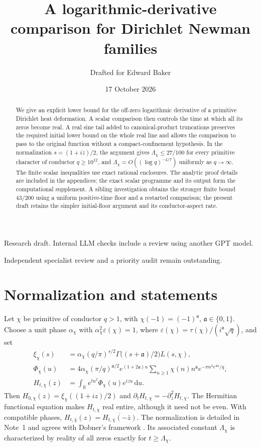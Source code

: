 \documentclass[11pt]{article}
\title{A logarithmic-derivative comparison for Dirichlet Newman families}
\author{Drafted for Edward Baker}
\date{17 October 2026}
\theoremstyle{remark}\newtheorem{remark}[theorem]{Remark}
\newcommand{\dd}{\mathrm{d}}
\begin{document}
\maketitle
\begin{center}\small Research draft. Internal LLM checks include a review using another GPT model.\par
Independent specialist review and a priority audit remain outstanding.\end{center}
\begin{abstract}
We give an explicit lower bound for the off-zero logarithmic derivative of
a primitive Dirichlet heat deformation. A scalar comparison then controls
the time at which all its zeros become real. A real sine tail added to
canonical-product truncations preserves the required initial lower bound
on the whole real line and allows the comparison to pass to the original
function without a compact-confinement hypothesis. In the normalization
$s=(1+iz)/2$, the argument gives $\Lambda_\chi\le27/100$ for every primitive
character of conductor $q\ge10^{12}$, and
$\Lambda_\chi=O((\log q)^{-4/7})$ uniformly as $q\to\infty$.
The finite scalar inequalities use exact rational enclosures. The analytic
proof details are included in the appendices; the exact scalar programme
and its output form the computational supplement. A sibling investigation
obtains the stronger finite bound $43/200$ using a uniform positive-time
floor and a restarted comparison; the present draft retains the simpler
initial-floor argument and its conductor-aspect rate.
\end{abstract}

\section{Normalization and statements}
Let $\chi$ be primitive of conductor $q>1$, with
$\chi(-1)=(-1)^{\mathfrak a}$, $\mathfrak a\in\{0,1\}$.
Choose a unit phase $\alpha_\chi$ with
$\alpha_\chi^2\varepsilon(\chi)=1$, where
$\varepsilon(\chi)=\tau(\chi)/(i^{\mathfrak a}\sqrt q)$, and set
\begin{align}
 \xi_\chi(s)&=\alpha_\chi(q/\pi)^{s/2}
 \Gamma\bigl((s+\mathfrak a)/2\bigr)L(s,\chi),\label{eq:xi}\\
 \Phi_\chi(u)&=4\alpha_\chi(\pi/q)^{\mathfrak a/2}
 e^{(1+2\mathfrak a)u}\sum_{n\ge1}\chi(n)n^{\mathfrak a}
 e^{-\pi n^2e^{4u}/q},\label{eq:phi}\\
 H_{t,\chi}(z)&=\int_{\mathbb R}e^{tu^2}\Phi_\chi(u)e^{izu}\,\dd u.
 \label{eq:heat}
\end{align}
Then $H_{0,\chi}(z)=\xi_\chi((1+iz)/2)$ and
$\partial_tH_{t,\chi}=-\partial_z^2H_{t,\chi}$.
The Hermitian functional equation makes $H_{t,\chi}$ real entire, although
it need not be even. With compatible phases,
$H_{t,\bar\chi}(z)=\overline{H_{t,\chi}(-\bar z)}$.
The normalization is detailed in Note~1 \cite{note1} and agrees with
Dobner's framework \cite{dobner}. Its associated constant $\Lambda_\chi$
is characterized by reality of all zeros exactly for $t\ge\Lambda_\chi$.
\end{document}
